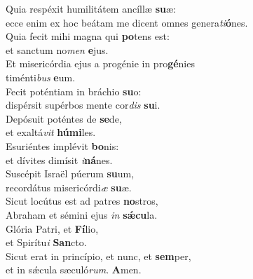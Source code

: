 \oddverse Quia respéxit humilitátem ancíllæ \textbf{su}æ:~\*\\
\oddverse ecce enim ex hoc beátam me dicent omnes genera\textit{ti}\textbf{ó}nes.\\
\evenverse Quia fecit mihi magna qui \textbf{po}tens est:~\*\\
\evenverse et sanctum no\textit{men} \textbf{e}jus.\\
\oddverse Et misericórdia ejus a progénie in pro\textbf{gé}nies~\*\\
\oddverse timénti\textit{bus} \textbf{e}um.\\
\evenverse Fecit poténtiam in bráchio \textbf{su}o:~\*\\
\evenverse dispérsit supérbos mente cor\textit{dis} \textbf{su}i.\\
\oddverse Depósuit poténtes de \textbf{se}de,~\*\\
\oddverse et exaltá\textit{vit} \textbf{hú}\textbf{mi}les.\\
\evenverse Esuriéntes implévit \textbf{bo}nis:~\*\\
\evenverse et dívites dimísit \textit{i}\textbf{ná}nes.\\
\oddverse Suscépit Israël púerum \textbf{su}um,~\*\\
\oddverse recordátus misericórdi\textit{æ} \textbf{su}æ.\\
\evenverse Sicut locútus est ad patres \textbf{no}stros,~\*\\
\evenverse Abraham et sémini ejus \textit{in} \textbf{sǽ}\textbf{cu}la.\\
\oddverse Glória Patri, et \textbf{Fí}lio,~\*\\
\oddverse et Spirítu\textit{i} \textbf{San}cto.\\
\evenverse Sicut erat in princípio, et nunc, et \textbf{sem}per,~\*\\
\evenverse et in sǽcula sæculó\textit{rum}. \textbf{A}men.\\
